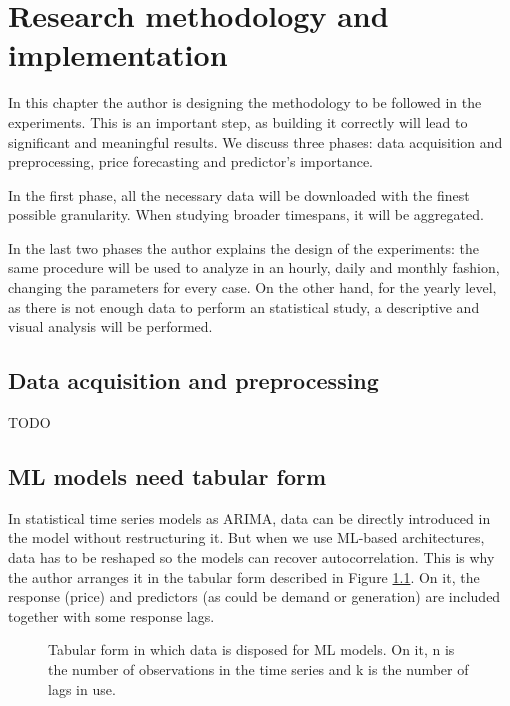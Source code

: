 \chapter{Research methodology and implementation}
\label{ch:methodology}
In this chapter the author is designing the methodology to be followed in the experiments. This is an important step, as building it correctly will lead to significant and meaningful results.
We discuss three phases: data acquisition and preprocessing, price forecasting and predictor's importance.

In the first phase, all the necessary data will be downloaded with the finest possible granularity.
When studying broader timespans, it will be aggregated.

In the last two phases the author explains the design of the experiments: the same procedure will be used to analyze in an hourly, daily and monthly fashion, changing the parameters for every case.
On the other hand, for the yearly level, as there is not enough data to perform an statistical study, a descriptive and visual analysis will be performed.

\section{Data acquisition and preprocessing}
TODO

\section{ML models need tabular form}
In statistical time series models as ARIMA, data can be directly introduced in the model without restructuring it.
But when we use ML-based architectures, data has to be reshaped so the models can recover autocorrelation.
This is why the author arranges it in the tabular form described in Figure \ref{fig:ml-arrangement}.
On it, the response (price) and predictors (as could be demand or generation) are included together with some response lags.

\begin{figure}[H]
\centering
    \caption{Tabular form in which data is disposed for ML models. On it, n is the number of observations in the time series and k is the number of lags in use.}
    \label{fig:ml-arrangement}
\end{figure}

